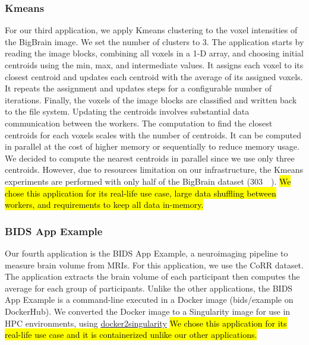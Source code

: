 \documentclass[AMA,STIX1COL]{WileyNJD-v2}
\newcommand{\HL}[1]{\hl{#1}}
\begin{document}
\subsubsection{Kmeans}
For our third application, we apply Kmeans clustering to the voxel
intensities of the BigBrain image. We set the number of clusters to 3. The
application starts by reading the image blocks, combining all voxels in a
1-D array, and choosing initial centroids using the min, max, and
intermediate values. It assigns each voxel to its closest centroid and
updates each centroid with the average of its assigned voxels. It repeats
the assignment and updates steps for a configurable number of iterations.
Finally, the voxels of the image blocks are classified and written back to
the file system. Updating the centroids involves substantial data
communication between the workers.
The computation to find the closest centroids for each voxels scales with the number of centroids.
It can be computed in parallel at the cost of higher memory or sequentially to reduce memory usage.
We decided to compute the nearest centroids in parallel since we use only three centroids.
However, due to resources limitation on our infrastructure, the Kmeans experiments
are performed with only half of the BigBrain dataset ({\SI{303}{\gibi\byte}}).
\HL{We chose this application for its real-life use case, large data shuffling between workers,
and requirements to keep all data in-memory.}
								
\subsubsection{BIDS App Example}
Our fourth application is the BIDS App Example, a neuroimaging pipeline to
measure brain volume from MRIs. For this application, we use the CoRR
dataset. The application extracts the brain volume of each participant
then computes the average for each group of participants. Unlike the other
applications, the BIDS App Example is a command-line executed in a Docker image
(bids/example on DockerHub). We converted the Docker image to a Singularity
image for use in HPC environments, using
\href{https://hub.docker.com/r/singularityware/docker2singularity/tags/}{docker2singularity}
\HL{We chose this application for its real-life use case and it is containerized unlike our other applications.}
										
\end{document}

